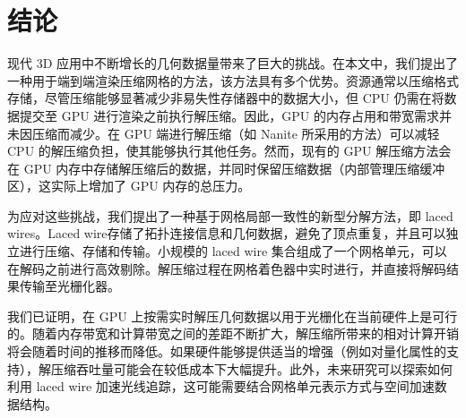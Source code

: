 \section{结论}

现代 3D 应用中不断增长的几何数据量带来了巨大的挑战。在本文中，我们提出了一种用于端到端渲染压缩网格的方法，该方法具有多个优势。资源通常以压缩格式存储，尽管压缩能够显著减少非易失性存储器中的数据大小，但 CPU 仍需在将数据提交至 GPU 进行渲染之前执行解压缩。因此，GPU 的内存占用和带宽需求并未因压缩而减少。在 GPU 端进行解压缩（如 Nanite 所采用的方法）可以减轻 CPU 的解压缩负担，使其能够执行其他任务。然而，现有的 GPU 解压缩方法会在 GPU 内存中存储解压缩后的数据，并同时保留压缩数据（内部管理压缩缓冲区），这实际上增加了 GPU 内存的总压力。

为应对这些挑战，我们提出了一种基于网格局部一致性的新型分解方法，即 laced wires。Laced wire存储了拓扑连接信息和几何数据，避免了顶点重复，并且可以独立进行压缩、存储和传输。小规模的 laced wire 集合组成了一个网格单元，可以在解码之前进行高效剔除。解压缩过程在网格着色器中实时进行，并直接将解码结果传输至光栅化器。

我们已证明，在 GPU 上按需实时解压几何数据以用于光栅化在当前硬件上是可行的。随着内存带宽和计算带宽之间的差距不断扩大，解压缩所带来的相对计算开销将会随着时间的推移而降低。如果硬件能够提供适当的增强（例如对量化属性的支持），解压缩吞吐量可能会在较低成本下大幅提升。此外，未来研究可以探索如何利用 laced wire 加速光线追踪，这可能需要结合网格单元表示方式与空间加速数据结构。 
